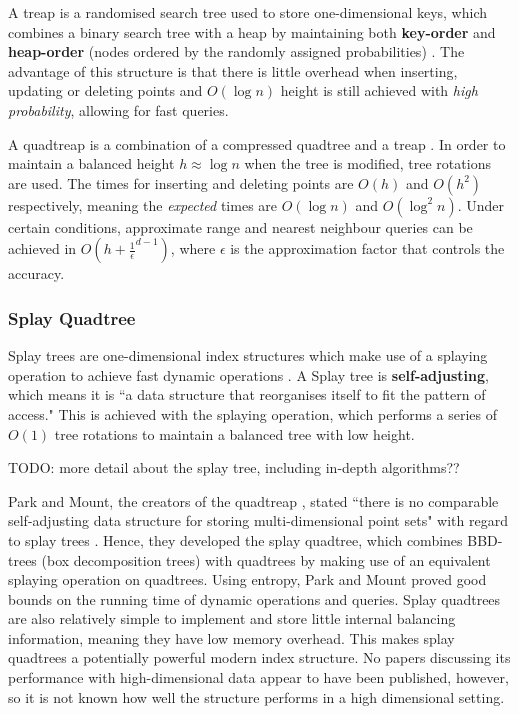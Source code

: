 A treap is a randomised search tree used to store one-dimensional keys, which combines a binary search tree with a heap by maintaining both \textbf{key-order} and \textbf{heap-order} (nodes ordered by the randomly assigned probabilities) \cite{quadtreap}. The advantage of this structure is that there is little overhead when inserting, updating or deleting points and $O(\log n)$ height is still achieved with \textit{high probability}, allowing for fast queries.

A quadtreap is a combination of a compressed quadtree and a treap \cite{quadtreap}. In order to maintain a balanced height $h \approx \log n$ when the tree is modified, tree rotations are used. The times for inserting and deleting points are $O(h)$ and $O(h^2)$ respectively, meaning the \textit{expected} times are $O(\log n)$ and $O(\log^2 n)$. Under certain conditions, approximate range and nearest neighbour queries can be achieved in $O(h + \frac{1}{\epsilon}^{d - 1})$, where $\epsilon$ is the approximation factor that controls the accuracy.

\subsubsection{Splay Quadtree}


Splay trees are one-dimensional index structures which make use of a splaying operation to achieve fast dynamic operations \cite{introduction-to-algorithms}. A Splay tree is \textbf{self-adjusting}, which means it is ``a data structure that reorganises itself to fit the pattern of access." \cite{splay-quadtree} This is achieved with the splaying operation, which performs a series of $O(1)$ tree rotations to maintain a balanced tree with low height.

TODO: more detail about the splay tree, including in-depth algorithms??

Park and Mount, the creators of the quadtreap \cite{quadtreap}, stated ``there is no comparable self-adjusting data structure for storing multi-dimensional point sets" with regard to splay trees \cite{splay-quadtree}. Hence, they developed the splay quadtree, which combines BBD-trees (box decomposition trees) with quadtrees by making use of an equivalent splaying operation on quadtrees. Using entropy, Park and Mount proved good bounds on the running time of dynamic operations and queries. Splay quadtrees are also relatively simple to implement and store little internal balancing information, meaning they have low memory overhead. This makes splay quadtrees a potentially powerful modern index structure. No papers discussing its performance with high-dimensional data appear to have been published, however, so it is not known how well the structure performs in a high dimensional setting.
